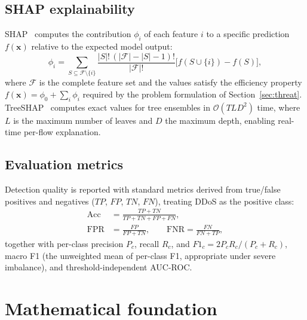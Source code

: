 \documentclass{ieeeaccess}
\begin{document}
\subsection{SHAP explainability}
SHAP~\cite{lundberg2017shap} computes the contribution $\phi_i$ of each feature $i$ to a specific prediction $f(\mathbf{x})$ relative to the expected model output:
\begin{equation}
\phi_i = \sum_{S \subseteq \mathcal{F} \setminus \{i\}} \frac{|S|!\,(|\mathcal{F}|-|S|-1)!}{|\mathcal{F}|!} \bigl[f(S \cup \{i\}) - f(S)\bigr],
\label{eq:shap}
\end{equation}
where $\mathcal{F}$ is the complete feature set and the values satisfy the efficiency property $f(\mathbf{x}) = \phi_0 + \sum_{i} \phi_i$ required by the problem formulation of Section~\ref{sec:threat}. TreeSHAP~\cite{lundberg2020treeshap} computes exact values for tree ensembles in $\mathcal{O}(TLD^2)$ time, where $L$ is the maximum number of leaves and $D$ the maximum depth, enabling real-time per-flow explanation.

\subsection{Evaluation metrics}
Detection quality is reported with standard metrics derived from true/false positives and negatives ($TP$, $FP$, $TN$, $FN$), treating DDoS as the positive class:
\begin{equation}
\begin{aligned}
\mathrm{Acc} &= \tfrac{TP+TN}{TP+TN+FP+FN}, \\
\mathrm{FPR} &= \tfrac{FP}{FP+TN}, \qquad \mathrm{FNR} = \tfrac{FN}{FN+TP},
\end{aligned}
\label{eq:metrics}
\end{equation}
together with per-class precision $P_c$, recall $R_c$, and $F1_c = 2P_cR_c/(P_c+R_c)$, macro F1 (the unweighted mean of per-class F1, appropriate under severe imbalance), and threshold-independent AUC-ROC.

\section{Mathematical foundation}
\label{sec:math}
\end{document}
